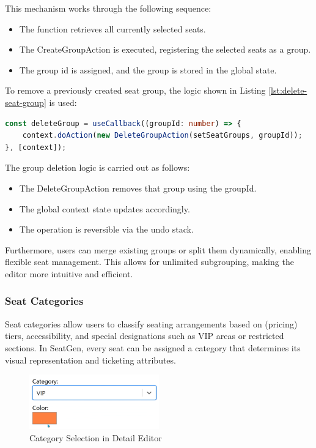 This mechanism works through the following sequence:
\begin{itemize}
    \item The function retrieves all currently selected seats.
    \item The CreateGroupAction is executed, registering the selected seats as a group.
    \item The group id is assigned, and the group is stored in the global state.
\end{itemize}

To remove a previously created seat group, the logic shown in Listing \ref{lst:delete-seat-group} is used:
\begin{lstlisting}[language=TypeScript, caption=Deleting Seat Groups, label=lst:delete-seat-group]
const deleteGroup = useCallback((groupId: number) => {
    context.doAction(new DeleteGroupAction(setSeatGroups, groupId));
}, [context]);
\end{lstlisting}

The group deletion logic is carried out as follows:
\begin{itemize}
    \item The DeleteGroupAction removes that group using the groupId.
    \item The global context state updates accordingly.
    \item The operation is reversible via the undo stack.
\end{itemize}

Furthermore, users can merge existing groups or split them dynamically, enabling flexible seat management. This allows for unlimited subgrouping, making the editor more intuitive and efficient.

\subsubsection{Seat Categories}

Seat categories allow users to classify seating arrangements based on (pricing) tiers, accessibility, and special designations such as VIP areas or restricted sections. In SeatGen, every seat can be assigned a category that determines its visual representation and ticketing attributes.

\begin{figure}[H]
    \centering
    \includegraphics[width=0.5\textwidth]{pics/DetailEditorCategory.png}
    \caption{Category Selection in Detail Editor}
    \label{fig:detail-editor-category}
\end{figure}

